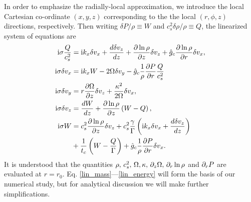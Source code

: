 In order to emphasize the radially-local approximation, we
introduce the local Cartesian co-ordinate $(x,y,z)$ corresponding to
the the local $(r,\phi,z)$ directions, respectively. Then writing
$\delta P /\rho \equiv W$ and $c_s^2\delta\rho/\rho\equiv Q$, the
linearized system of equations are 
\begin{align}
  \mathrm{i}\sigma \frac{Q}{c_s^2}  &=  \mathrm{i} k_x \delta v_x + \frac{d\delta
    v_z}{dz} + \frac{\partial\ln{\rho}}{\partial z}\delta v_z + \hat{g}_c
  \frac{\partial\ln{\rho}}{\partial r} \delta v_x,\label{lin_mass}\\
  \mathrm{i}\sigma \delta v_x  &= \mathrm{i} k_x W - 2\Omega\delta v_y -
  \hat{g}_c\frac{1}{\rho}\frac{\partial P}{\partial r}\frac{Q}{c_s^2}\label{lin_vx}\\
   \mathrm{i} \sigma\delta v_y &= r\frac{\partial \Omega}{\partial z}\delta v_z +
  \frac{\kappa^2}{2\Omega}\delta v_x, \label{lin_vy}\\
   \mathrm{i}\sigma\delta v_z &= \frac{dW}{dz} +
  \frac{\partial\ln{\rho}}{\partial z}\left(W-Q\right), \label{lin_vz}\\
  \mathrm{i} \sigma W &= c_s^2\frac{\partial\ln{\rho}}{\partial z}\delta v_z +
  c_s^2\frac{\gamma}{\Gamma} \left(\mathrm{i} k_x\delta v_x + \frac{d\delta
      v_z}{dz}\right) \notag\\
  &+ \frac{1}{t_c}\left(W - \frac{Q}{\Gamma}\right) +
  \hat{g}_c\frac{1}{\rho}\frac{\partial P}{\partial r}\delta v_x.\label{lin_energy}
\end{align}
It is understood that the quantities $\rho,\,c_s^2,\,\Omega,\kappa,\, 
\partial_z\Omega,\, \partial_r\ln{\rho} $ and $ \partial_r P$ are evaluated at $r=r_0$.   
Eq. \ref{lin_mass}---\ref{lin_energy} will form the basis of our numerical
study, but for analytical discussion
we will make further simplifications. 











